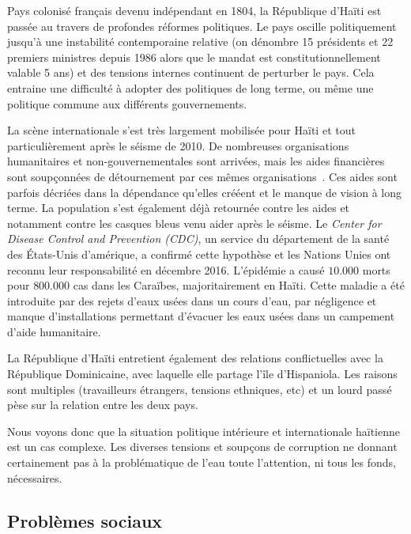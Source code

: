 \documentclass{eplmastersthesis_FR}
\begin{document}
				Pays colonisé français devenu indépendant en 1804, la République d'Haïti est passée au travers de profondes réformes politiques. Le pays oscille politiquement jusqu'à une instabilité contemporaine relative (on dénombre 15 présidents et 22 premiers ministres depuis 1986 alors que le mandat est constitutionnellement valable 5 ans) et des tensions internes continuent de perturber le pays. Cela entraine une difficulté à adopter des politiques de long terme, ou même une politique commune aux différents gouvernements.

				La scène internationale s'est très largement mobilisée pour Haïti et tout particulièrement après le séisme de 2010. De nombreuses organisations humanitaires et non-gouvernementales sont arrivées, mais les aides financières sont soupçonnées de détournement par ces mêmes organisations~\cite{ref:analyse_contextuelle_commune}. Ces aides sont parfois décriées dans la dépendance qu'elles crééent et le manque de vision à long terme. La population s'est également déjà retournée contre les aides et notamment contre les casques bleus venu aider après le séisme. Le \emph{Center for Disease Control and Prevention (CDC)}, un service du département de la santé des \'Etats-Unis d'amérique, a confirmé cette hypothèse et les Nations Unies ont reconnu leur responsabilité en décembre 2016. L'épidémie a causé $10.000$ morts pour $800.000$ cas dans les Caraïbes, majoritairement en Haïti. Cette maladie a été introduite par des rejets d'eaux usées dans un cours d'eau, par négligence et manque d'installations permettant d'évacuer les eaux usées dans un campement d'aide humanitaire.

				La République d'Haïti entretient également des relations conflictuelles avec la République Dominicaine, avec laquelle elle partage l'île d'Hispaniola. Les raisons sont multiples (travailleurs étrangers, tensions ethniques, etc) et un lourd passé pèse sur la relation entre les deux pays.

				Nous voyons donc que la situation politique intérieure et internationale haïtienne est un cas complexe. Les diverses tensions et soupçons de corruption ne donnant certainement pas à la problématique de l'eau toute l'attention, ni tous les fonds, nécessaires.

			\subsection*{Problèmes sociaux}
\end{document}
